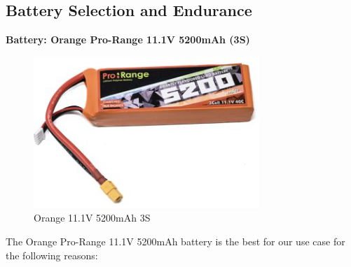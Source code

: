 \documentclass[12pt]{report}
\begin{document}
      \subsection{Battery Selection and Endurance}
      \noindent \textbf{Battery: Orange Pro-Range 11.1V 5200mAh (3S)} \\
      \begin{figure}
        \includegraphics[width=1\linewidth]{battery.png}
        \caption{Orange 11.1V 5200mAh 3S}
        \label{fig:battery3s}
      \end{figure}
     
      The Orange Pro-Range 11.1V 5200mAh battery is the best for our use case for the following reasons: \\
\end{document}
